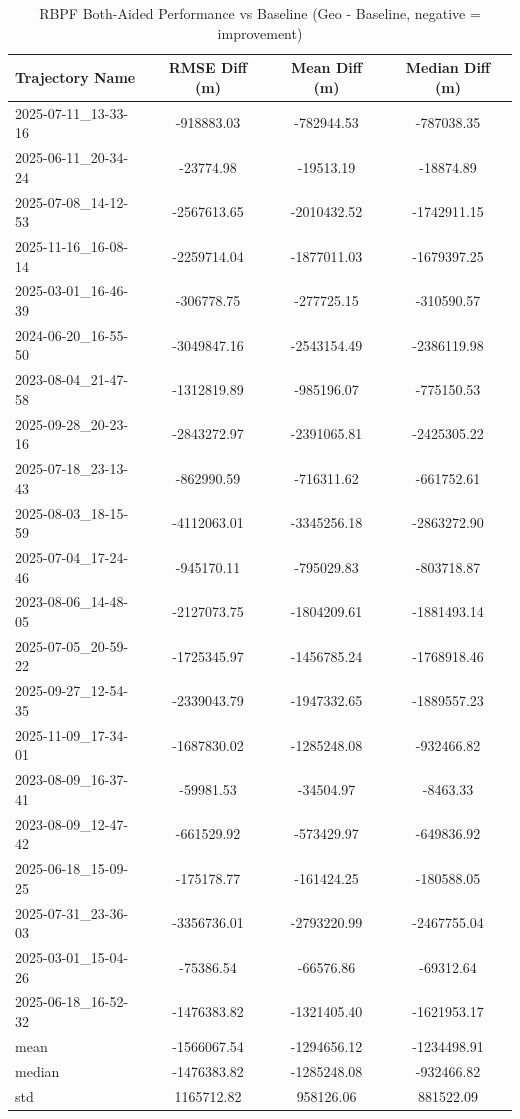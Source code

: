 \begin{table}[h]
    \centering
    \caption{RBPF Both-Aided Performance vs Baseline (Geo - Baseline, negative = improvement)}
    \begin{tabular}{ || l || c c c || }
    \toprule
    Trajectory Name & RMSE Diff (m) & Mean Diff (m) & Median Diff (m) \\
    \midrule
    2025-07-11\_13-33-16 & -918883.03 & -782944.53 & -787038.35 \\
    2025-06-11\_20-34-24 & -23774.98 & -19513.19 & -18874.89 \\
    2025-07-08\_14-12-53 & -2567613.65 & -2010432.52 & -1742911.15 \\
    2025-11-16\_16-08-14 & -2259714.04 & -1877011.03 & -1679397.25 \\
    2025-03-01\_16-46-39 & -306778.75 & -277725.15 & -310590.57 \\
    2024-06-20\_16-55-50 & -3049847.16 & -2543154.49 & -2386119.98 \\
    2023-08-04\_21-47-58 & -1312819.89 & -985196.07 & -775150.53 \\
    2025-09-28\_20-23-16 & -2843272.97 & -2391065.81 & -2425305.22 \\
    2025-07-18\_23-13-43 & -862990.59 & -716311.62 & -661752.61 \\
    2025-08-03\_18-15-59 & -4112063.01 & -3345256.18 & -2863272.90 \\
    2025-07-04\_17-24-46 & -945170.11 & -795029.83 & -803718.87 \\
    2023-08-06\_14-48-05 & -2127073.75 & -1804209.61 & -1881493.14 \\
    2025-07-05\_20-59-22 & -1725345.97 & -1456785.24 & -1768918.46 \\
    2025-09-27\_12-54-35 & -2339043.79 & -1947332.65 & -1889557.23 \\
    2025-11-09\_17-34-01 & -1687830.02 & -1285248.08 & -932466.82 \\
    2023-08-09\_16-37-41 & -59981.53 & -34504.97 & -8463.33 \\
    2023-08-09\_12-47-42 & -661529.92 & -573429.97 & -649836.92 \\
    2025-06-18\_15-09-25 & -175178.77 & -161424.25 & -180588.05 \\
    2025-07-31\_23-36-03 & -3356736.01 & -2793220.99 & -2467755.04 \\
    2025-03-01\_15-04-26 & -75386.54 & -66576.86 & -69312.64 \\
    2025-06-18\_16-52-32 & -1476383.82 & -1321405.40 & -1621953.17 \\
    \midrule
    mean & -1566067.54 & -1294656.12 & -1234498.91 \\
    median & -1476383.82 & -1285248.08 & -932466.82 \\
    std & 1165712.82 & 958126.06 & 881522.09 \\
    \bottomrule
    \end{tabular}
    \label{tab:rbpf_both_results}
\end{table}